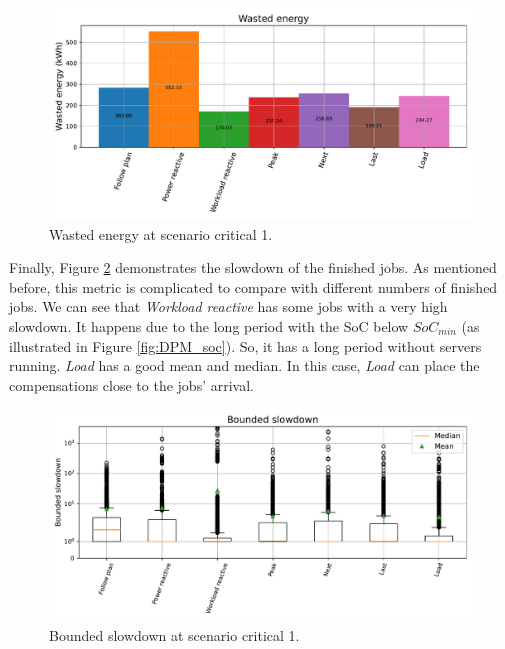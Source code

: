\begin{figure}[!htb]
    \centering
    \includegraphics[scale=0.55]{Images/Compensations/energy_critical_1.pdf}
    \caption{Wasted energy at scenario critical 1.}
    \label{fig:energy_critical_1}
\end{figure}

Finally, Figure \ref{fig:slowdown_critical_1} demonstrates the slowdown of the finished jobs. As mentioned before, this metric is complicated to compare with different numbers of finished jobs. We can see that \emph{Workload reactive} has some jobs with a very high slowdown. It happens due to the long period with the SoC below $SoC_{min}$ (as illustrated in Figure \ref{fig:DPM_soc}). So, it has a long period without servers running. \emph{Load} has a good mean and median. In this case, \emph{Load} can place the compensations close to the jobs' arrival. 

\begin{figure}[!htb]
    \centering
    \includegraphics[scale=0.55]{Images/Compensations/slowdown_critical_1.pdf}
    \caption{Bounded slowdown at scenario critical 1.}
    \label{fig:slowdown_critical_1}
\end{figure}

\clearpage


